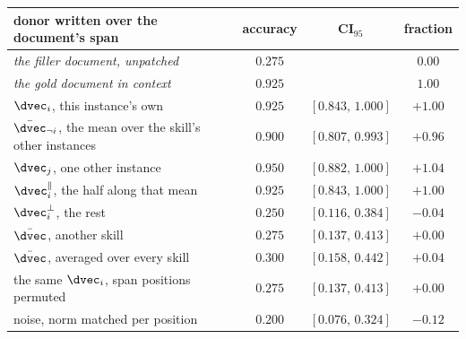 \begin{tabular}{@{}lccc@{}}
\toprule
donor written over the document's span & accuracy & CI$_{95}$ & fraction \\
\midrule
\emph{the filler document, unpatched} & $0.275$ & & $0.00$ \\
\emph{the gold document in context} & $0.925$ & & $1.00$ \\
\midrule
$\dvec_i$, this instance's own & $0.925$ & $[0.843,\,1.000]$ & $+1.00$ \\
$\bar{\dvec}_{\neg i}$, the mean over the skill's other instances & $0.900$ & $[0.807,\,0.993]$ & $+0.96$ \\
$\dvec_j$, one other instance & $0.950$ & $[0.882,\,1.000]$ & $+1.04$ \\
$\dvec_i^{\parallel}$, the half along that mean & $0.925$ & $[0.843,\,1.000]$ & $+1.00$ \\
$\dvec_i^{\perp}$, the rest & $0.250$ & $[0.116,\,0.384]$ & $-0.04$ \\
$\bar{\dvec}$, another skill & $0.275$ & $[0.137,\,0.413]$ & $+0.00$ \\
$\bar{\dvec}$, averaged over every skill & $0.300$ & $[0.158,\,0.442]$ & $+0.04$ \\
the same $\dvec_i$, span positions permuted & $0.275$ & $[0.137,\,0.413]$ & $+0.00$ \\
noise, norm matched per position & $0.200$ & $[0.076,\,0.324]$ & $-0.12$ \\
\bottomrule
\end{tabular}
